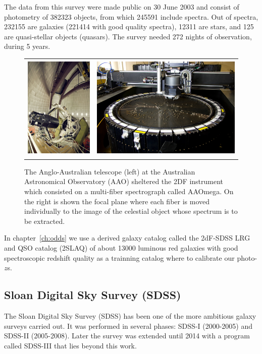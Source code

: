 The data from this survey were made public on 30 June 2003 and consist of photometry of 382323 objects, from which 245591 include spectra. Out of spectra, 232155 are galaxies (221414 with good quality spectra), 12311 are stars, and 125 are quasi-stellar objects (quasars). The survey needed 272 nights of observation, during 5 years. 
\begin{figure}
\centering
\begin{tabular}{rl}
\includegraphics[height=50mm]{./plots/2df_camera.jpg} & \includegraphics[height=50mm]{./plots/2df_spectrograph.jpg} \\
\end{tabular}
\caption{The Anglo-Australian telescope (left) at the Australian Astronomical Observatory (AAO) sheltered the 2DF instrument which consisted on a multi-fiber spectrograph called AAOmega. On the right is shown the focal plane where each fiber is moved individually to the image of the celestial object whose spectrum is to be extracted.}
\label{fig:2df_survey}
\end{figure}

In chapter~\ref{ch:odds} we use a derived galaxy catalog called the 2dF-SDSS LRG and QSO catalog (2SLAQ) \citep{Cannon2006} of about 13000 luminous red galaxies with good spectroscopic redshift quality as a trainning catalog where to calibrate our photo-$z$s.

\subsection{Sloan Digital Sky Survey (SDSS)}
\label{sec:sdss}
The Sloan Digital Sky Survey (SDSS) \citep{York2000} has been one of the more ambitious galaxy surveys carried out. It was performed in several phases: SDSS-I (2000-2005) and SDSS-II (2005-2008). Later the survey was extended until 2014 with a program called SDSS-III that lies beyond this work.

